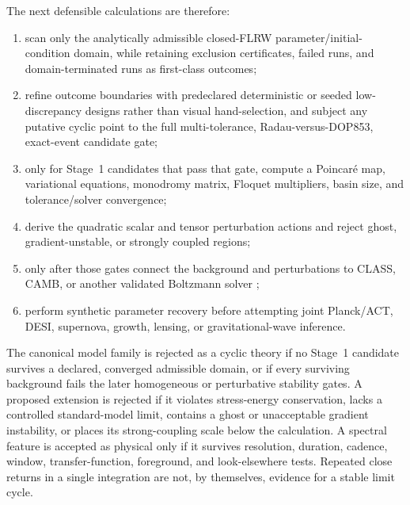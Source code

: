 The next defensible calculations are therefore:
\begin{enumerate}
\item scan only the analytically admissible closed-FLRW parameter/initial-condition domain, while retaining exclusion certificates, failed runs, and domain-terminated runs as first-class outcomes;
\item refine outcome boundaries with predeclared deterministic or seeded low-discrepancy designs rather than visual hand-selection, and subject any putative cyclic point to the full multi-tolerance, Radau-versus-DOP853, exact-event candidate gate;
\item only for Stage~1 candidates that pass that gate, compute a Poincar\'e map, variational equations, monodromy matrix, Floquet multipliers, basin size, and tolerance/solver convergence;
\item derive the quadratic scalar and tensor perturbation actions and reject ghost, gradient-unstable, or strongly coupled regions;
\item only after those gates connect the background and perturbations to CLASS, CAMB, or another validated Boltzmann solver \cite{class2011,camb2000};
\item perform synthetic parameter recovery before attempting joint Planck/ACT, DESI, supernova, growth, lensing, or gravitational-wave inference.
\end{enumerate}

The canonical model family is rejected as a cyclic theory if no Stage~1 candidate survives a declared, converged admissible domain, or if every surviving background fails the later homogeneous or perturbative stability gates. A proposed extension is rejected if it violates stress-energy conservation, lacks a controlled standard-model limit, contains a ghost or unacceptable gradient instability, or places its strong-coupling scale below the calculation. A spectral feature is accepted as physical only if it survives resolution, duration, cadence, window, transfer-function, foreground, and look-elsewhere tests. Repeated close returns in a single integration are not, by themselves, evidence for a stable limit cycle.
